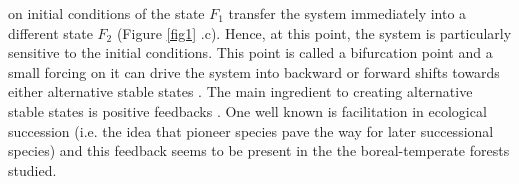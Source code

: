 on initial conditions of the state $F_1$ transfer the system immediately into a
different state $F_2$ (Figure \ref{fig1} .c). Hence, at this point, the
system is particularly sensitive to the initial conditions. This point is
called a bifurcation point and a small forcing on it can drive the system into
backward or forward shifts towards either alternative stable states
\cite{scheffer2009critical}. The main ingredient to creating alternative
stable states is positive feedbacks \cite{scheffer2009critical}. One well
known is facilitation in ecological succession (i.e. the idea that pioneer
species pave the way for later successional species) and this feedback seems
to be present in the the boreal-temperate forests studied. \\

